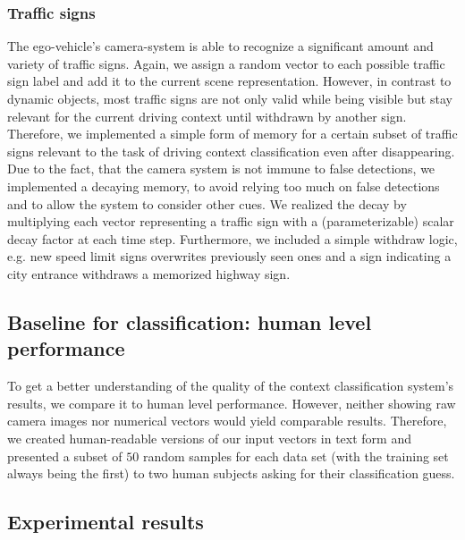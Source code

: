 \subsubsection{Traffic signs}
The ego-vehicle's camera-system \cite{Aeberhard2015} is able to recognize a significant amount and variety of traffic signs.
Again, we assign a random vector to each possible traffic sign label and add it to the current scene representation.
However, in contrast to dynamic objects, most traffic signs are not only valid while being visible but stay relevant for the current driving context until withdrawn by another sign.
Therefore, we implemented a simple form of memory for a certain subset of traffic signs relevant to the task of driving context classification even after disappearing. %
Due to the fact, that the camera system is not immune to false detections, we implemented a decaying memory, to avoid relying too much on false detections and to allow the system to consider other cues.
We realized the decay by multiplying each vector representing a traffic sign with a (parameterizable) scalar decay factor  at each time step.
Furthermore, we included a simple withdraw logic, e.g. new speed limit signs overwrites previously seen ones and a sign indicating a city entrance withdraws a memorized highway sign.\\
\subsection{Baseline for classification: human level performance}
To get a better understanding of the quality of the context classification system's results, we compare it to human level performance.
However, neither showing raw camera images nor numerical vectors would yield comparable results.
Therefore, we created human-readable versions of our input vectors in text form and presented a subset of $50$ random samples for each data set (with the training set always being the first) to two human subjects asking for their classification guess.
\subsection{Experimental results}
